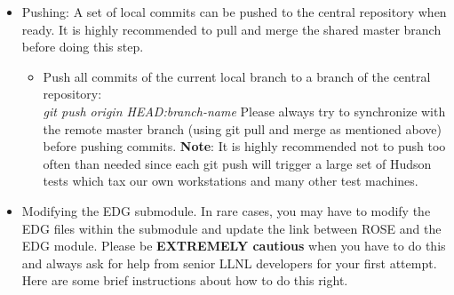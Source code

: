 \begin{itemize}
\begin{itemize}
          \item Switch to and synchronize a local master branch: \textit{git checkout master; git pull origin master}
          \item Don't forget to update the link to the EDG submodule: \textit{git submodule update}
          \item Switch to your local branch and merge with local master: \textit{git checkout your-local-branch-name; git merge master}
    \item Alternatively, you can stay in your local branch and directly pull the remote master and update the EDG submodule: 
           \textit{git pull origin master; git submodule update}
   \end{itemize}   

\item Pushing: A set of local commits can be pushed to the central repository when ready.
It is highly recommended to pull and merge the shared master branch before doing this step.
   \begin{itemize}
          \item Push all commits of the current local branch to a branch of the central repository:\\ \textit{git push origin HEAD:branch-name}
 Please always try to synchronize with the
          remote master branch (using git pull and merge as mentioned
          above) before pushing commits. \textbf{Note}: It is highly recommended not to push too often than
          needed since each git push will trigger a large set of
          Hudson tests which tax our own workstations and many other test machines.


   \end{itemize}

\item Modifying the EDG submodule. In rare cases, you may have to modify the EDG files within the submodule and update the link between ROSE and the EDG module. Please be {\bf EXTREMELY cautious} when you have to do this and always
ask for help from senior LLNL developers for your first attempt. Here are some brief instructions about how to do this right.
     \begin{itemize}


\end{itemize}
\end{itemize}
